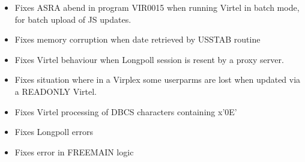 \documentclass[letterpaper,10pt,english]{sphinxmanual}
\begin{document}
\begin{itemize}
\item {} 
Fixes ASRA abend in program VIR0015 when running Virtel in batch mode, for batch upload of JS updates.

\end{itemize}

\begin{itemize}
\item {} 
Fixes memory corruption when date retrieved by USSTAB routine

\end{itemize}

\begin{itemize}
\item {} 
Fixes Virtel behaviour when Longpoll session is resent by a proxy server.

\end{itemize}

\begin{itemize}
\item {} 
Fixes situation where in a Virplex some userparms are lost when updated via a READONLY Virtel.

\end{itemize}

\begin{itemize}
\item {} 
Fixes Virtel processing of DBCS characters containing x’0E’

\end{itemize}

\begin{itemize}
\item {} 
Fixes Longpoll errors

\end{itemize}

\begin{itemize}
\item {} 
Fixes error in FREEMAIN logic

\end{itemize}
\end{document}
